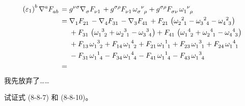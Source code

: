 \begin{xiti}
\begin{jie}
		\begin{align*}
			\tensor{\left( \varepsilon_1 \right)}{^b} \tensor{\nabla}{^a} \tensor{F}{_a_b} ={} & \tensor{g}{^\nu^\sigma} \tensor{\nabla}{_\sigma} \tensor{F}{_\nu_1} + \tensor{g}{^\sigma^\rho} \tensor{F}{_\nu_1} \tensor{\omega}{_\sigma^\nu_\rho} + \tensor{g}{^\sigma^\rho} \tensor{F}{_\sigma_\nu} \tensor{\omega}{_1^\nu_\rho}\\
			={} & \tensor{\nabla}{_1} \tensor{F}{_2_1} - \Nabla{4} \tensor{F}{_3_1} - \Nabla{3} \tensor{F}{_4_1} + \tensor{F}{_2_1} \left( \tensor{\omega}{_2^2_1} - \tensor{\omega}{_3^2_4} - \tensor{\omega}{_4^2_3} \right)\\
			&{} + \tensor{F}{_3_1} \left( \tensor{\omega}{_1^3_2} + \tensor{\omega}{_2^3_1} - \tensor{\omega}{_3^3_4} \right) + \tensor{F}{_4_1} \left( \tensor{\omega}{_1^4_2} + \tensor{\omega}{_2^4_1} - \tensor{\omega}{_4^4_3} \right)\\
			&{} + \tensor{F}{_1_3} \tensor{\omega}{_1^3_2} + \tensor{F}{_1_4} \tensor{\omega}{_1^4_2} + \tensor{F}{_2_1} \tensor{\omega}{_1^1_1} + \tensor{F}{_2_3} \tensor{\omega}{_1^3_1} + \tensor{F}{_2_4} \tensor{\omega}{_1^4_1}\\
			&{} - \tensor{F}{_3_1} \tensor{\omega}{_1^1_4} - \tensor{F}{_3_4} \tensor{\omega}{_1^4_4} - \tensor{F}{_4_1} \tensor{\omega}{_1^1_4} - \tensor{F}{_4_3} \tensor{\omega}{_1^3_4}\\
			={}&
		\end{align*}
		我先放弃了……
	\end{jie}

	\item 试证式 (8-8-7) 和 (8-8-10)。


\end{xiti}
